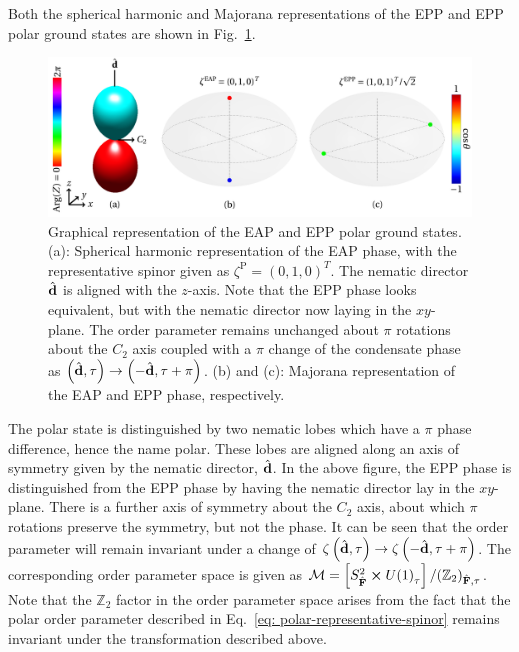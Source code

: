 Both the spherical harmonic and Majorana representations of the EPP and EPP
polar ground states are shown in Fig.~\ref{fig: spin-1-polar-graph}.
\begin{figure}
    \centering
    \includegraphics[width=\textwidth]
    {gfx/ch-groundStateSymmetries/spin-1-polar.pdf}
    \caption[Graphical representations of the spin-1 easy-axis polar and
    easy-plane polar ground states]{\label{fig: spin-1-polar-graph}Graphical
    representation of the EAP and EPP polar ground states.
    (a): Spherical harmonic representation of the EAP phase, with the
    representative spinor given as \(\zeta^\mathrm{P}={(0, 1, 0)}^T\).
    The nematic director \(\hat{\vb{d}}\) is aligned with the \(z\)-axis.
    Note that the EPP phase looks equivalent, but with the nematic director
    now laying in the \(xy\)-plane.
    The order parameter remains unchanged about \(\pi \) rotations about the
    \(C_2\) axis coupled with a \(\pi \) change of the condensate phase as
    \(\left(\hat{\vb{d}}, \tau\right) \rightarrow
    \left(-\hat{\vb{d}}, \tau+\pi\right)\).
    (b) and (c): Majorana representation of the EAP and EPP phase,
    respectively.}
\end{figure}
The polar state is distinguished by two nematic lobes which have a \(\pi \)
phase difference, hence the name polar.
These lobes are aligned along an axis of symmetry given by the nematic director,
\(\hat{\vb{d}}\).
In the above figure, the EPP phase is distinguished from the EPP phase by having
the nematic director lay in the \(xy\)-plane.
There is a further axis of symmetry about the \(C_2\) axis, about which \(\pi \)
rotations preserve the symmetry, but not the phase.
It can be seen that the order parameter will remain invariant under a change of
\(\zeta\left(\hat{\vb{d}}, \tau\right) \rightarrow
\zeta\left(-\hat{\vb{d}}, \tau + \pi\right)\).
The corresponding order parameter space is given as \(\mathcal{M} =
\left[S^2_{\hat{\vb{F}}} \cross {U(1)}_\tau\right] /
{({\mathbb{Z}}_2)}_{\hat{\vb{F}}, \tau} \).
Note that the \(\mathbb{Z}_2\) factor in the order parameter space arises from
the fact that the polar order parameter described in
Eq.~\eqref{eq: polar-representative-spinor} remains invariant under the
transformation described above.

